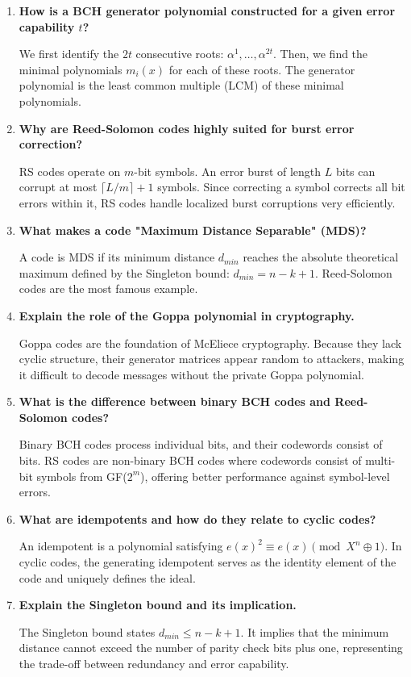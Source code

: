 \documentclass[12pt,a4paper]{article}
\newcommand{\Q}[1]{\textbf{#1}\par\noindent\ignorespaces}
\begin{document}
\newpage

\begin{tcolorbox}[exambox, title={\textbf{Frequently Asked / Viva Questions}}]
\begin{enumerate}[topsep=0pt, label=\textbf{Q\arabic*.}, itemsep=5pt]
  \item \Q{How is a BCH generator polynomial constructed for a given error capability $t$?}
    We first identify the $2t$ consecutive roots: $\alpha^1, \dots, \alpha^{2t}$. Then, we find the minimal polynomials $m_i(x)$ for each of these roots. The generator polynomial is the least common multiple (LCM) of these minimal polynomials.
  \item \Q{Why are Reed-Solomon codes highly suited for burst error correction?}
    RS codes operate on $m$-bit symbols. An error burst of length $L$ bits can corrupt at most $\lceil L/m \rceil + 1$ symbols. Since correcting a symbol corrects all bit errors within it, RS codes handle localized burst corruptions very efficiently.
  \item \Q{What makes a code "Maximum Distance Separable" (MDS)?}
    A code is MDS if its minimum distance $d_{min}$ reaches the absolute theoretical maximum defined by the Singleton bound: $d_{min} = n - k + 1$. Reed-Solomon codes are the most famous example.
  \item \Q{Explain the role of the Goppa polynomial in cryptography.}
    Goppa codes are the foundation of McEliece cryptography. Because they lack cyclic structure, their generator matrices appear random to attackers, making it difficult to decode messages without the private Goppa polynomial.
  \item \Q{What is the difference between binary BCH codes and Reed-Solomon codes?}
    Binary BCH codes process individual bits, and their codewords consist of bits. RS codes are non-binary BCH codes where codewords consist of multi-bit symbols from GF($2^m$), offering better performance against symbol-level errors.
  \item \Q{What are idempotents and how do they relate to cyclic codes?}
    An idempotent is a polynomial satisfying $e(x)^2 \equiv e(x) \pmod{X^n \oplus 1}$. In cyclic codes, the generating idempotent serves as the identity element of the code and uniquely defines the ideal.
  \item \Q{Explain the Singleton bound and its implication.}
    The Singleton bound states $d_{min} \le n - k + 1$. It implies that the minimum distance cannot exceed the number of parity check bits plus one, representing the trade-off between redundancy and error capability.

\end{enumerate}
\end{tcolorbox}
\end{document}

